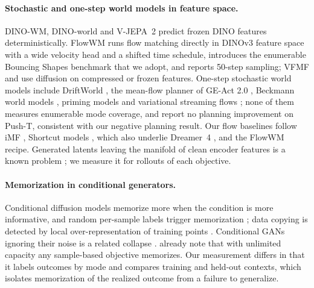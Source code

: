 \paragraph{Stochastic and one-step world models in feature space.}
DINO-WM, DINO-world and V-JEPA~2 \citep{zhou2025dinowm,baldassarre2025dinoworld,assran2025vjepa2} predict frozen DINO features deterministically. FlowWM \citep{porcher2026flowwm} runs flow matching directly in DINOv3 feature space with a wide velocity head and a shifted time schedule, introduces the enumerable Bouncing Shapes benchmark that we adopt, and reports 50-step sampling; VFMF \citep{boduljak2025vfmf} and \citet{walker2025generalist} use diffusion on compressed or frozen features. One-step stochastic world models include DriftWorld \citep{lu2026driftworld}, the mean-flow planner of GE-Act 2.0 \citep{agibot2026geact}, Beckmann world models \citep{lee2026beckmann}, priming models \citep{park2026priming} and variational streaming flows \citep{hsu2026vsf}; none of them measures enumerable mode coverage, and \citet{lee2026beckmann} report no planning improvement on Push-T, consistent with our negative planning result. Our flow baselines follow iMF \citep{geng2025imf}, Shortcut models \citep{frans2025shortcut}, which also underlie Dreamer~4 \citep{hafner2025dreamer4}, and the FlowWM recipe. Generated latents leaving the manifold of clean encoder features is a known problem \citep{zheng2025rae,boduljak2025vfmf,karypidis2026latentforesight}; we measure it for rollouts of each objective.

\paragraph{Memorization in conditional generators.}
Conditional diffusion models memorize more when the condition is more informative, and random per-sample labels trigger memorization \citep{gu2025memorization,kim2026memorization}; data copying is detected by local over-representation of training points \citep{meehan2020nonparametric,somepalli2023diffusion,carlini2023extracting}. Conditional GANs ignoring their noise is a related collapse \citep{yang2019dsgan,mao2019msgan}. \citet{li2018imle} already note that with unlimited capacity any sample-based objective memorizes. Our measurement differs in that it labels outcomes by mode and compares training and held-out contexts, which isolates memorization of the realized outcome from a failure to generalize.

